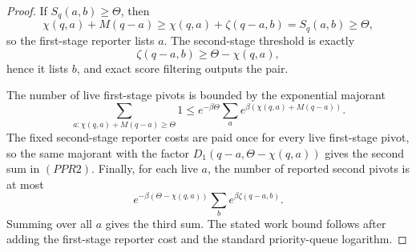 \documentclass[10pt]{article}
\theoremstyle{definition}
\begin{document}
\begin{proof}
   If \(S_q(a,b)\ge\Theta\), then
   \[
      \chi(q,a)+M(q-a)
      \ge
      \chi(q,a)+\zeta(q-a,b)
      =
      S_q(a,b)
      \ge\Theta,
   \]
   so the first-stage reporter lists \(a\).  The second-stage threshold is
   exactly
   \[
      \zeta(q-a,b)\ge\Theta-\chi(q,a),
   \]
   hence it lists \(b\), and exact score filtering outputs the pair.

   The number of live first-stage pivots is bounded by the exponential
   majorant
   \[
      \sum_{a:\chi(q,a)+M(q-a)\ge\Theta}1
      \le
      e^{-\beta\Theta}
      \sum_a e^{\beta(\chi(q,a)+M(q-a))}.
   \]
   The fixed second-stage reporter costs are paid once for every live
   first-stage pivot, so the same majorant with the factor
   \(D_1(q-a,\Theta-\chi(q,a))\) gives the second sum in \((PPR2)\).  Finally,
   for each live \(a\), the number of reported second pivots is at most
   \[
      e^{-\beta(\Theta-\chi(q,a))}
      \sum_b e^{\beta\zeta(q-a,b)}.
   \]
   Summing over all \(a\) gives the third sum.  The stated work bound follows
   after adding the first-stage reporter cost and the standard priority-queue
   logarithm.
\end{proof}
\end{document}
